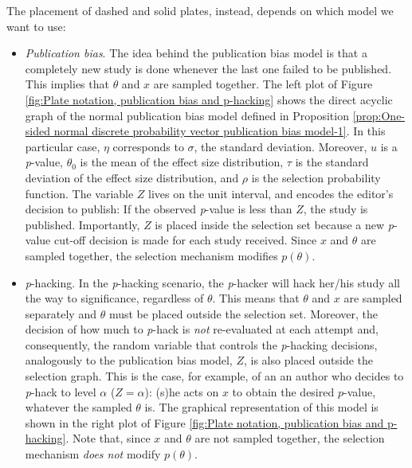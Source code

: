 \documentclass[preprint, authoryear]{elsarticle}
\theoremstyle{plain}
\theoremstyle{definition}
\begin{document}
The placement of dashed and solid plates, instead, depends on which model we want to use:
\begin{itemize}
\item \emph{Publication bias}. The idea behind the publication bias model is that a completely new study is done whenever the last one failed to be published. This implies that $\theta$ and $x$ are sampled together. The left plot of Figure \ref{fig:Plate notation, publication bias and p-hacking} shows the direct acyclic graph of the normal publication bias model defined in Proposition \ref{prop:One-sided normal discrete probability vector publication bias model-1}. In this particular case, $\eta$ corresponds to $\sigma$, the standard deviation. Moreover, $u$ is a \emph{p}-value, $\theta_{0}$ is the mean of the effect size distribution, $\tau$ is the standard deviation of the effect size distribution, and $\rho$ is the selection probability function. The variable $Z$ lives on the unit interval, and encodes the editor's decision to publish: If the observed \emph{p}-value is less than $Z$, the study is published. Importantly, $Z$ is placed inside the selection set because a new \emph{p}-value cut-off decision is made for each study received. Since $x$ and $\theta$ are sampled together, the selection mechanism modifies $p\left(\theta\right)$.%

\item \emph{p}-hacking. In the \emph{p}-hacking scenario, the \emph{p}-hacker will hack her/his study all the way to significance, regardless of $\theta$. This means that $\theta$ and $x$ are sampled separately and $\theta$ must be placed outside the selection set. Moreover, the decision of how much to \emph{p}-hack is \emph{not} re-evaluated at each attempt and, consequently, the random variable that controls the \emph{p}-hacking decisions, analogously to the publication bias model, $Z$, is also placed outside the selection graph. This is the case, for example, of an an author who decides to \emph{p}-hack to level $\alpha$ ($Z = \alpha$): (s)he acts on $x$ to obtain the desired $p$-value, whatever the sampled $\theta$ is. The graphical representation of this model is shown in the right plot of Figure \ref{fig:Plate notation, publication bias and p-hacking}. Note that, since $x$ and $\theta$ are not sampled together, the selection mechanism \emph{does not} modify $p\left(\theta\right)$.
\end{itemize}
\end{document}
